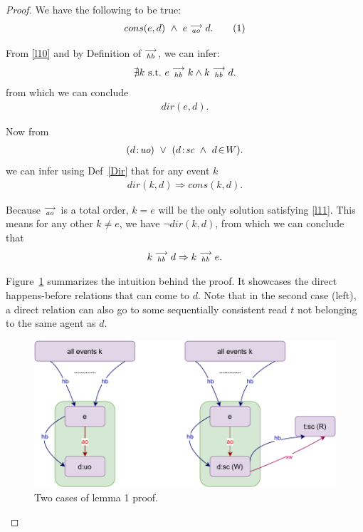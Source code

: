 \begin{proof}
    
    We have the following to be true:
    \begin{align*}
        cons(e,d) \ \wedge \ e\stackrel{\longrightarrow}{_{ao}}d.
        \tag{1}
        \label{l10}
    \end{align*}

    From \ref{l10} and by Definition of $\stackrel{\longrightarrow}{_{hb}}$, we can infer:
    \begin{align*}
        \nexists k \ \text{s.t.} \ e\stackrel{\longrightarrow}{_{hb}}k \wedge k\stackrel{\longrightarrow}{_{hb}}d.
    \end{align*}
    from which we can conclude 
    \begin{align*}
        dir(e,d).
    \end{align*}

    Now from 
    \begin{align*}
        (d\!:\!\textit{uo}) \ \vee \
        (d\!:\!\textit{sc} \ \wedge \ d\!\in\!W).
    \end{align*}
    we can infer using Def~\ref{Dir} that for any event $k$
    \begin{align*}
        dir(k,d) \Rightarrow cons(k,d).
        \tag{2}
        \label{l11}
    \end{align*}

    Because $\stackrel{\longrightarrow}{_{ao}}$ is a total order, $k=e$ will be the only solution satisfying \ref{l11}.  
    This means for any other $k \neq e$, we have $\neg dir(k,d)$, from which we can conclude that     
    \begin{align*}
        k\stackrel{\longrightarrow}{_{hb}}d \Rightarrow k\stackrel{\longrightarrow}{_{hb}}e.
    \end{align*}
    
    Figure~\ref{lemma:first} summarizes the intuition behind the proof.
    It showcases the direct happens-before relations that can come to $d$. 
    Note that in the second case (left), a direct relation can also go to some sequentially consistent read $t$ not belonging to the same agent as $d$.
    \begin{figure}[H]
        \centering
        \includegraphics[scale=0.7]{4.InstructionReordering/3.Lemmas/Lemma1.pdf}
        \caption{Two cases of lemma 1 proof.}
        \label{lemma:first}
    \end{figure}
    
\end{proof}

